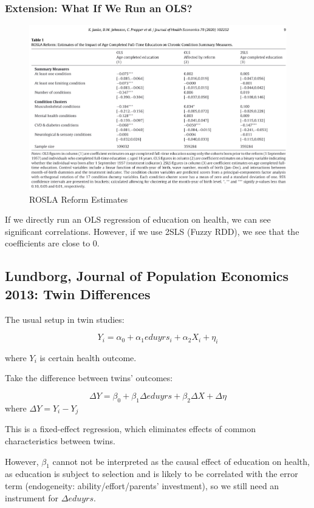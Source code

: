         \subsubsection{Extension: What If We Run an OLS?}
            \begin{figure}[H]
                \centering
                \includegraphics[width=5in]{images/ch3/40.png}
                \caption{ROSLA Reform Estimates}
            \end{figure}        
            If we directly run an OLS regression of education on health, we can see significant correlations. However, if we use 2SLS (Fuzzy RDD), we see that the coefficients are close to 0.

    \subsection{Lundborg, Journal of Population Economics 2013: Twin Differences}\label{lundborg_twin_diff}
        
        The usual setup in twin studies:

        \[ Y_i = \alpha_0+\alpha_1 eduyrs_i+\alpha_2 X_i+\eta_i \]
        
        where  $Y_i$ is certain health outcome.
        
        Take the difference between twins' outcomes:
        
        \[ \Delta Y = \beta_0+\beta_1\Delta eduyrs+\beta_2 \Delta X+\Delta \eta \]
        where  $\Delta Y=Y_i-Y_j$ 
        
        This is a fixed-effect regression, which eliminates effects of common characteristics between twins.
        
        However, $\beta_1$ cannot not be interpreted as the causal effect of education on health, as education is subject to selection and is likely to be correlated with the error term (endogeneity: ability/effort/parents' investment), so we still need an instrument for $\Delta eduyrs$.
        
